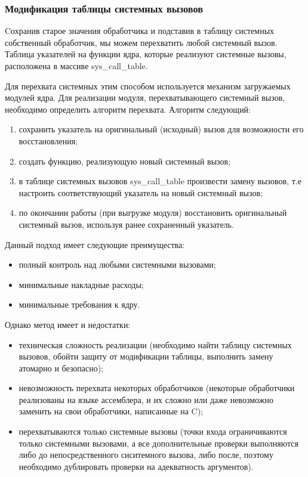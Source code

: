 \documentclass[a4paper,14pt]{article}
\begin{document}
\subsubsection{Модификация таблицы системных вызовов}

Cохранив старое значения обработчика и подставив в таблицу системных собственный обработчик, мы можем перехватить любой системный вызов. Таблица указателей на функции ядра, которые реализуют системные вызовы, расположена в
массиве sys\_call\_table.

Для перехвата системных этим способом используется механизм загружаемых модулей ядра. Для реализации модуля, перехватывающего системный вызов, необходимо определить алгоритм перехвата. Алгоритм следующий:

\begin{enumerate}
	\item сохранить указатель на оригинальный (исходный) вызов для возможности его восстановления;
	\item создать функцию, реализующую новый системный вызов;
	\item в таблице системных вызовов sys\_call\_table произвести замену вызовов, т.е настроить соответствующий указатель на новый системный вызов;
	\item по окончании работы (при выгрузке модуля) восстановить оригинальный
	системный вызов, используя ранее сохраненный указатель.
\end{enumerate}

Данный подход имеет следующие преимущества:

\begin{itemize}
	\item полный контроль над любыми системными вызовами;
	\item минимальные накладные расходы;
	\item минимальные требования к ядру.
\end{itemize}

Однако метод имеет и недостатки:

\begin{itemize}
	\item техническая сложность реализации (необходимо найти таблицу системных вызовов, обойти защиту от модификации таблицы, выполнить замену атомарно и безопасно);
	\item невозможность перехвата некоторых обработчиков (некоторые обработчики реализованы на языке ассемблера, и их сложно или даже невозможно заменить на свои обработчики, написанные на C);
	\item перехватываются только системные вызовы (точки входа ограничиваются только системными вызовами, а все дополнительные проверки выполняются либо до непосредственного сиситемного вызова, либо после, поэтому необходимо дублировать проверки на адекватность аргументов).
\end{itemize}
\end{document}
